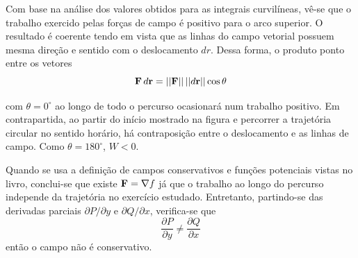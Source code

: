 \documentclass[a4paper, 12pt, brazilian]{article}
\begin{document}
	Com base na análise dos valores obtidos para as integrais curvilíneas, vê-se que o trabalho exercido pelas forças de campo é positivo para o arco superior. O resultado é coerente tendo em vista que as linhas do campo vetorial possuem mesma direção e sentido com o deslocamento $dr$. Dessa forma, o produto ponto entre os vetores	
	\begin{equation}
		\textbf{F}\,d\textbf{r}=||\textbf{F}||\,||d\textbf{r}||\cos\theta
	\end{equation}
	
	com $\theta=0^{\circ}$ ao longo de todo o percurso ocasionará num trabalho positivo. Em contrapartida, ao partir do início mostrado na figura e percorrer a trajetória circular no sentido horário, há contraposição entre o deslocamento e as linhas de campo. Como $\theta=180^{\circ}$, $W<0$.
	
	Quando se usa a definição de campos conservativos e funções potenciais vistas no livro, conclui-se que existe $\textbf{F}=\nabla f$ já que o trabalho ao longo do percurso independe da trajetória no exercício estudado. Entretanto, partindo-se das derivadas parciais $\partial P/\partial y$ e $\partial Q/\partial x$, verifica-se que
	\begin{equation}
		\dfrac{\partial P}{\partial y}\neq\dfrac{\partial Q}{\partial x}
	\end{equation} 
	então o campo não é conservativo.
	
	
	
\end{document}
